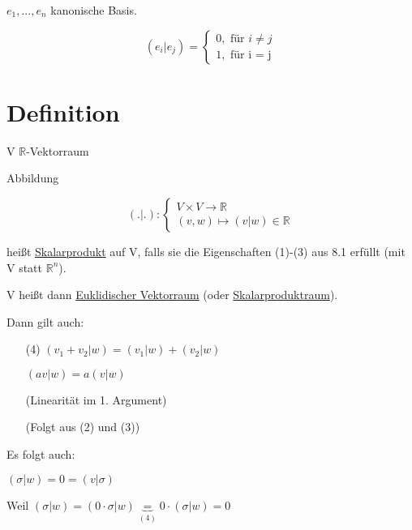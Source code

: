 \documentclass[a4paper, openany]{book}
\begin{document}
        $e_1, ..., e_n$ kanonische Basis.

        \begin{equation}
         (e_i | e_j) = \begin{cases}0, \text{ für $i \neq j$} \\ 1, \text{ für i = j} \end{cases}
        \end{equation} 

        \section{Definition}

        V $\mathbb{R}$-Vektorraum

        Abbildung 

        \begin{equation*}
          (.|.) : \begin{cases} V \times V \rightarrow \mathbb{R} \\ (v,w) \mapsto (v | w) \in \mathbb{R} \end{cases}
        \end{equation*}

        heißt \underline{Skalarprodukt} auf V, falls sie die Eigenschaften (1)-(3) aus 8.1 erfüllt (mit V statt $\mathbb{R}^n$).

        \par \medskip

        V heißt dann \underline{Euklidischer Vektorraum} (oder \underline{Skalarproduktraum}).

        Dann gilt auch:

        \begin{itemize}
          \item[(4)] $(v_1+v_2|w) = (v_1|w) + (v_2|w)$

          $(av | w) = a (v|w)$

          (Linearität im 1. Argument)

          (Folgt aus (2) und (3))

        \end{itemize}

        Es folgt auch:

        \begin{center}
          $(\sigma | w) = 0 = (v | \sigma)$
        \end{center}

        Weil $(\sigma | w ) = (0 \cdot \sigma | w) \underbrace{=}_{(4)} 0 \cdot (\sigma | w) = 0$
\end{document}
